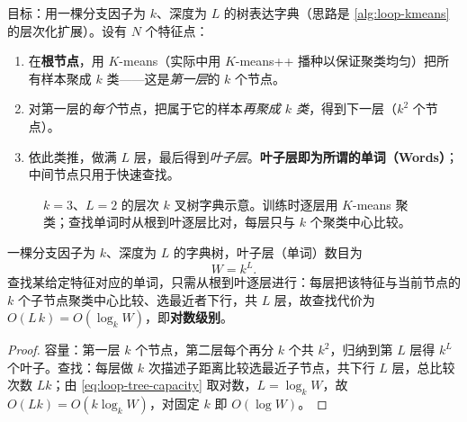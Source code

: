 \begin{algo}\label{alg:loop-ktree}
目标：用一棵分支因子为 $k$、深度为 $L$ 的树表达字典（思路是 \cref{alg:loop-kmeans} 的层次化扩展）。设有 $N$ 个特征点：
\begin{enumerate}
  \item 在\textbf{根节点}，用 $K$-means（实际中用 $K$-means++ 播种以保证聚类均匀）把所有样本聚成 $k$ 类——这是\emph{第一层}的 $k$ 个节点。
  \item 对第一层的\emph{每个}节点，把属于它的样本\emph{再聚成 $k$ 类}，得到下一层（$k^2$ 个节点）。
  \item 依此类推，做满 $L$ 层，最后得到\emph{叶子层}。\textbf{叶子层即为所谓的单词（Words）}；中间节点只用于快速查找。
\end{enumerate}
\end{algo}

\begin{figure}[ht]
\centering
{}
\caption{$k=3$、$L=2$ 的层次 $k$ 叉树字典示意。训练时逐层用 $K$-means 聚类；查找单词时从根到叶逐层比对，每层只与 $k$ 个聚类中心比较。}
\label{fig:loop-ktree}
\end{figure}

\begin{theorem}[$k$ 叉树字典的容量与查找复杂度]\label{thm:loop-tree-complexity}
一棵分支因子为 $k$、深度为 $L$ 的字典树，叶子层（单词）数目为
\begin{equation}
  W = k^{L}.
  \label{eq:loop-tree-capacity}
\end{equation}
查找某给定特征对应的单词，只需从根到叶逐层进行：每层把该特征与当前节点的 $k$ 个子节点聚类中心比较、选最近者下行，共 $L$ 层，故查找代价为 $O(L\,k)=O(\log_k W)$，即\textbf{对数级别}。
\end{theorem}
\begin{proof}
容量：第一层 $k$ 个节点，第二层每个再分 $k$ 个共 $k^2$，归纳到第 $L$ 层得 $k^L$ 个叶子。查找：每层做 $k$ 次描述子距离比较选最近子节点，共下行 $L$ 层，总比较次数 $Lk$；由 \cref{eq:loop-tree-capacity} 取对数，$L=\log_k W$，故 $O(Lk)=O(k\log_k W)$，对固定 $k$ 即 $O(\log W)$。
\end{proof}

